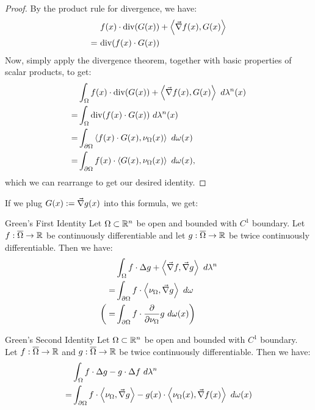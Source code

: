 \begin{proof}
	By the product rule for divergence, we have:
	\begin{align*}
		~&f(x) \cdot \textnormal{div}(G(x)) + \left\langle \vec{\nabla} f(x), G(x) \right\rangle\\
		=~&\textnormal{div}(f(x) \cdot G(x))
	\end{align*}
	Now, simply apply the divergence theorem, together with basic properties of scalar products, to get:
	\begin{align*}
		&
		\int_\Omega f(x) \cdot \textnormal{div}(G(x)) + \left\langle \vec{\nabla} f(x), G(x) \right\rangle ~d\lambda^n(x)\\
		=&
		\int_\Omega \textnormal{div} (f(x) \cdot G(x)) ~d\lambda^n(x)\\
		=&
		\int_{\partial \Omega} \left\langle f(x) \cdot G(x), \nu_\Omega(x) \right\rangle ~d\omega(x)\\
		= &\int_{\partial \Omega} f(x) \cdot \left\langle G(x), \nu_\Omega(x) \right\rangle ~d\omega(x),
	\end{align*}
	which we can rearrange to get our desired identity.
\end{proof}
If we plug $G(x) := \vec{\nabla} g(x)$ into this formula, we get:
\begin{importantcorollary}{Green's First Identity}{}
	Let $\Omega \subset \mathbb{R}^n$ be open and bounded with $C^1$ boundary. Let $f: \overline{{\Omega}} \to \mathbb{R}$ be continuously differentiable and let $g : \overline{{\Omega}} \to \mathbb{R}$ be twice continuously differentiable. Then we have:
	\begin{align*}
		&\int_\Omega f \cdot \Delta g + \left\langle \vec{\nabla} f, \vec{\nabla} g \right\rangle ~d\lambda^n\\
		= &\int_{\partial \Omega} f \cdot \left\langle \nu_\Omega, \vec{\nabla} g \right\rangle ~d\omega\\
		\bigg{(}= &\int_{\partial \Omega} f \cdot \pdv{\nu_\Omega} g ~d\omega(x)\bigg{)} 
	\end{align*}
\end{importantcorollary}
\begin{importanttheorem}{Green's Second Identity}{}
	Let $\Omega \subset \mathbb{R}^n$ be open and bounded with $C^1$ boundary. Let $f: \overline{{\Omega}} \to \mathbb{R}$ and $g : \overline{{\Omega}} \to \mathbb{R}$ be twice continuously differentiable. Then we have:
	\begin{align*}
		&\int_\Omega f \cdot  \Delta g - g \cdot \Delta f ~d\lambda^n\\ = &\int_{\partial \Omega} f \cdot \left\langle \nu_\Omega, \vec{\nabla} g \right\rangle
		-
		g(x)
		\cdot
		\left\langle \nu_\Omega(x), \vec{\nabla} f(x) \right\rangle
		~d\omega(x)
	\end{align*}
\end{importanttheorem}
